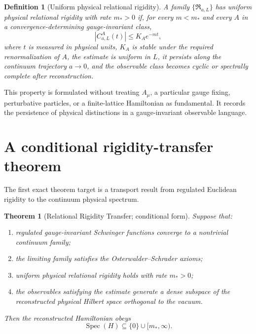 \documentclass[11pt]{article}
\newtheorem{definition}{Definition}
\newtheorem{theorem}{Theorem}
\theoremstyle{remark}
\newcommand{\Spec}{\operatorname{Spec}}
\begin{document}
\begin{definition}[Uniform physical relational rigidity]
A family $\{\mathfrak R_{a,L}\}$ has uniform physical relational rigidity with
rate $m_*>0$ if, for every $m<m_*$ and every $A$ in a
convergence-determining gauge-invariant class,
\begin{equation}
  \left|C^A_{a,L}(t)\right|
  \leq K_A e^{-mt},
  \label{eq:uniform-rigidity}
\end{equation}
where $t$ is measured in physical units, $K_A$ is stable under the required
renormalization of $A$, the estimate is uniform in $L$, it persists along the
continuum trajectory $a\to0$, and the observable class becomes cyclic or
spectrally complete after reconstruction.
\end{definition}

This property is formulated without treating $A_\mu$, a particular gauge
fixing, perturbative particles, or a finite-lattice Hamiltonian as fundamental.
It records the persistence of physical distinctions in a gauge-invariant
observable language.

\section{A conditional rigidity-transfer theorem}

The first exact theorem target is a transport result from regulated Euclidean
rigidity to the continuum physical spectrum.

\begin{theorem}[Relational Rigidity Transfer; conditional form]
Suppose that:
\begin{enumerate}[label=(\roman*),leftmargin=2.3em]
  \item regulated gauge-invariant Schwinger functions converge to a nontrivial
        continuum family;
  \item the limiting family satisfies the Osterwalder--Schrader axioms;
  \item uniform physical relational rigidity holds with rate $m_*>0$;
  \item the observables satisfying the estimate generate a dense subspace of
        the reconstructed physical Hilbert space orthogonal to the vacuum.
\end{enumerate}
Then the reconstructed Hamiltonian obeys
\begin{equation}
  \Spec(H)\subseteq\{0\}\cup[m_*,\infty).
  \label{eq:transferred-gap}
\end{equation}
\end{theorem}
\end{document}

